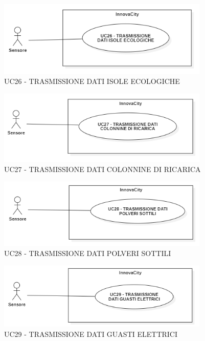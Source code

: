 
\begin{figure}[H]
    \centering
    \includegraphics[width=0.9\textwidth]{../Images/uc26.PNG}
    \caption{UC26 - TRASMISSIONE DATI ISOLE ECOLOGICHE}
    \label{fig:UC7}
\end{figure}

\begin{figure}[H]
    \centering
    \includegraphics[width=0.9\textwidth]{../Images/uc27.PNG}
    \caption{UC27 - TRASMISSIONE DATI COLONNINE DI RICARICA}
    \label{fig:UC7}
\end{figure}

\begin{figure}[H]
    \centering
    \includegraphics[width=0.9\textwidth]{../Images/uc28.PNG}
    \caption{UC28 - TRASMISSIONE DATI POLVERI SOTTILI}
    \label{fig:UC7}
\end{figure}

\begin{figure}[H]
    \centering
    \includegraphics[width=0.9\textwidth]{../Images/uc29.PNG}
    \caption{UC29 - TRASMISSIONE DATI GUASTI ELETTRICI}
    \label{fig:UC7}
\end{figure}


\setcounter{rowcounter}{1}
